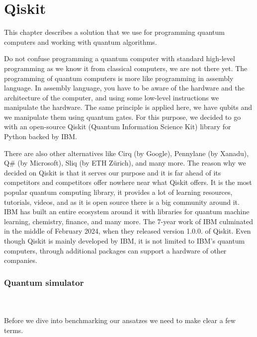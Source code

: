\chapter{Qiskit}\label{ch:qiskit}
This chapter describes a solution that we use for programming quantum computers and working with quantum algorithms. 

Do not confuse programming a quantum computer with standard high-level programming as we know it from classical computers, we are not there yet. The programming of quantum computers is more like programming in assembly language. In assembly language, you have to be aware of the hardware and the architecture of the computer, and using some low-level instructions we manipulate the hardware. The same principle is applied here, we have qubits and we manipulate them using quantum gates. For this purpose, we decided to go with an open-source Qiskit (Quantum Information Science Kit) library for Python backed by IBM.

There are also other alternatives like Cirq (by Google), Pennylane (by Xanadu), Q\# (by Microsoft), Sliq (by ETH Zürich), and many more.  The reason why we decided on Qiskit is that it serves our purpose and it is far ahead of its competitors and competitors offer nowhere near what Qiskit offers. It is the most popular quantum computing library, it provides a lot of learning resources, tutorials, videos, and as it is open source there is a big community around it. IBM has built an entire ecosystem around it \cite{qiskit_ecosystem} with libraries for quantum machine learning, chemistry, finance, and many more. The 7-year work of IBM culminated in the middle of February 2024, when they released version 1.0.0. of Qiskit. Even though Qiskit is mainly developed by IBM, it is not limited to IBM's quantum computers, through additional packages can support a hardware of other companies.

\subsection{Quantum simulator}





\\
\\
Before we dive into benchmarking our ansatzes we need to make clear a few terms.

